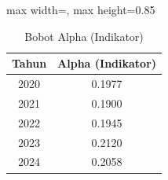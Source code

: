 \begin{table}[H]
\centering
\caption{Bobot Alpha (Indikator)} \makeatletter{}\makeatother
\begin{adjustbox}{max width=\textwidth, max height=0.85\textheight}
\begin{tabular}{|c|c|}
\hline
\textbf{Tahun} & \textbf{Alpha (Indikator)} \\
\hline
2020 & 0.1977 \\
2021 & 0.1900 \\
2022 & 0.1945 \\
2023 & 0.2120 \\
2024 & 0.2058 \\
\hline
\end{tabular}
\end{adjustbox}
\end{table}
